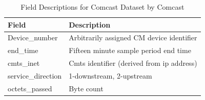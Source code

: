 

\begin{table}[ht]
\small
\begin{tabular}{|l|l|}
\hline
\textbf{Field}         & \textbf{Description}                      \\ \hline
Device\_number         & Arbitrarily assigned CM device identifier \\ \hline
end\_time              & Fifteen minute sample period end time     \\ \hline
cmts\_inet             & Cmts identifier (derived from ip address) \\ \hline
service\_direction     & 1-downstream, 2-upstream                  \\ \hline
octets\_passed         & Byte count                                \\ \hline
\end{tabular}
\caption{Field Descriptions for Comcast Dataset by Comcast}
\label{tab:field-description}
\end{table}

